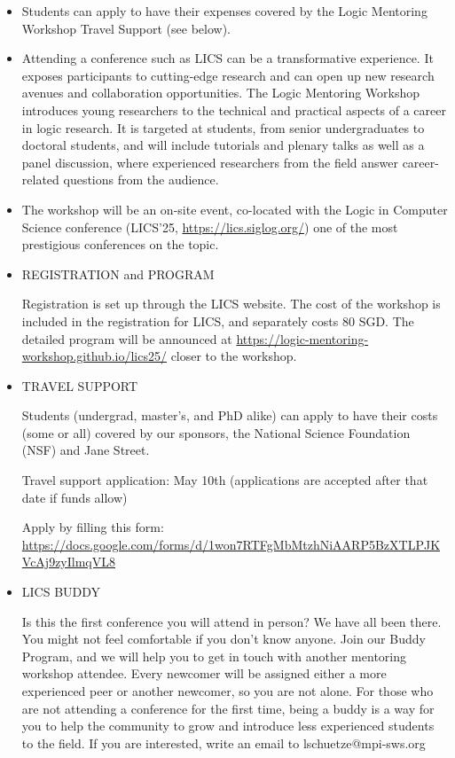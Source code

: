 \documentclass[prodmode,acmtecs]{acmsmall} %
\begin{document}
\begin{itemize}\item  Students can apply to have their expenses covered by the Logic Mentoring Workshop Travel Support (see below).  
 
\item  Attending a conference such as LICS can be a transformative experience. It exposes participants to cutting-edge research and can open up new research avenues and collaboration opportunities. The Logic Mentoring Workshop introduces young researchers to the technical and practical aspects of a career in logic research. It is targeted at students, from senior undergraduates to doctoral students, and will include tutorials and plenary talks as well as a panel discussion, where experienced researchers from the field answer career-related questions from the audience. 
 
\item  The workshop will be an on-site event, co-located with the Logic in Computer Science conference (LICS’25, \href{https://lics.siglog.org/}{https://lics.siglog.org/}) one of the most prestigious conferences on the topic.  
 
\item  REGISTRATION and PROGRAM 
 
  Registration is set up through the LICS website. The cost of the workshop is included in the registration for LICS, and separately costs 80 SGD. The detailed program will be announced at \href{https://logic-mentoring-workshop.github.io/lics25/}{https://logic-mentoring-workshop.github.io/lics25/} closer to the workshop.  
 
\item  TRAVEL SUPPORT 
 
  Students (undergrad, master's, and PhD alike) can apply to have their costs (some or all) covered by our sponsors, the National Science Foundation (NSF) and Jane Street.  
 
Travel support application: May 10th (applications are accepted after that date if funds allow) 
 
  Apply by filling this form: \href{https://docs.google.com/forms/d/1won7RTFgMbMtzhNiAARP5BzXTLPJKVcAj9zyIlmqVL8}{https://docs.google.com/forms/d/1won7RTFgMbMtzhNiAARP5BzXTLPJKVcAj9zyIlmqVL8} 
 
\item  LICS BUDDY 
 
  Is this the first conference you will attend in person? We have all been there. You might not feel comfortable if you don't know anyone. Join our Buddy Program, and we will help you to get in touch with another mentoring workshop attendee. Every newcomer will be assigned either a more experienced peer or another newcomer, so you are not alone. For those who are not attending a conference for the first time, being a buddy is a way for you to help the community to grow and introduce less experienced students to the field. If you are interested, write an email to lschuetze@mpi-sws.org 
 

\end{itemize}
\end{document}
